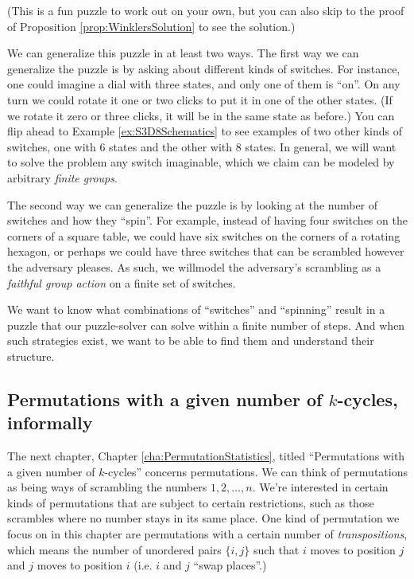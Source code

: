 (This is a fun puzzle to work out on your own, but you can also skip to
the proof of Proposition \ref{prop:WinklersSolution} to see the solution.)

We can generalize this puzzle in at least two ways.
The first way we can generalize the puzzle is by asking about different kinds of
switches. For instance, one could imagine a dial with three states,
and only one of them is ``on''.
On any turn we could rotate it one or two
clicks to put it in one of the other states.
(If we rotate it zero or three clicks, it will be in the same state as before.)
You can flip ahead to Example \ref{ex:S3D8Schematics} to see examples of two
other kinds of switches, one with $6$ states and the other with $8$ states.
In general, we will want to solve the problem any switch imaginable, which
we claim can be modeled by arbitrary \textit{finite groups}.

The second way we can generalize the puzzle is by looking at the number of
switches and how they ``spin''.
For example, instead of having four switches on the corners of a square table,
we could have six switches on the corners of a rotating hexagon, or perhaps
we could have three switches that can be scrambled however the adversary pleases.
As such, we willmodel the adversary's scrambling as a
\textit{faithful group action} on a finite set of switches.

We want to know what combinations of ``switches'' and ``spinning''
result in a puzzle that our puzzle-solver can solve within a finite number of
steps. And when such strategies exist, we want to be able to find them and
understand their structure.

\subsection{Permutations with a given number of \texorpdfstring{$k$}{k}-cycles, informally}
The next chapter, Chapter \ref{cha:PermutationStatistics}, titled
``Permutations with a given number of $k$-cycles''
concerns permutations.
We can think of permutations as being ways of scrambling the numbers
$1, 2, \dots, n$.
We're interested in certain kinds of permutations that are subject to certain
restrictions, such as those scrambles where no number stays in its same place.
One kind of permutation we focus on in this chapter are permutations with
a certain number of \textit{transpositions}, which means the number of unordered
pairs $\{i, j\}$ such that $i$ moves to position $j$ and $j$ moves to position $i$
(i.e. $i$ and $j$ ``swap places''.)

